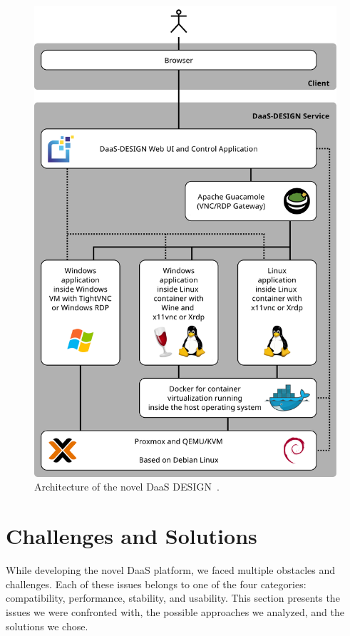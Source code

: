 \documentclass[runningheads]{llncs}
\begin{document}
\begin{figure}
\includegraphics[width=\textwidth]{images/DaaS_DESIGN_Architecture_v11_english.pdf}
\caption{Architecture of the novel DaaS DESIGN~\cite{OJCC_2023v8i1n01_Baun}.} \label{figure_architecture}
\end{figure}

\section{Challenges and Solutions}
\label{sec:AnalysisPossibleComponents}


While developing the novel DaaS platform, we faced multiple obstacles and challenges. Each of these issues belongs to one of the four categories: compatibility, performance, stability, and usability. This section presents the issues we were confronted with, the possible approaches we analyzed, and the solutions we chose.
\end{document}
